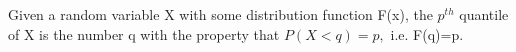 Given a random variable X with some distribution function F(x), the $p^{th}$  quantile of X is the number q with the property that 
$ P(X \lt q)=p, $ i.e. F(q)=p.